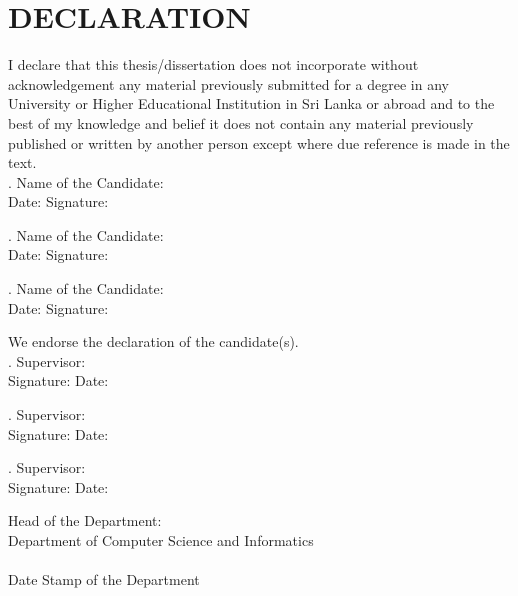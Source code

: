 \section*{DECLARATION}

I declare that this thesis/dissertation does not incorporate without
acknowledgement any material previously submitted for a degree in any
University or Higher Educational Institution in Sri Lanka or abroad and to the
best of my knowledge and belief it does not contain any material previously
published or written by another person except where due reference is made in
the text. \\

. Name of the Candidate: \\
\noindent Date: \makebox[3cm]{\hrulefill} \hfill Signature: \makebox[5cm]{\hrulefill}

\vspace{0.5\baselineskip}

. Name of the Candidate: \\
\noindent Date: \makebox[3cm]{\hrulefill} \hfill Signature: \makebox[5cm]{\hrulefill}

\vspace{0.5\baselineskip}

. Name of the Candidate: \\
\noindent Date: \makebox[3cm]{\hrulefill} \hfill Signature: \makebox[5cm]{\hrulefill}

\vspace{0.75\baselineskip}

\noindent We endorse the declaration of the candidate(s). \\

. Supervisor: \\
\noindent Signature: \makebox[5cm]{\hrulefill} \hfill Date: \makebox[3cm]{\hrulefill}

\vspace{0.5\baselineskip}

. Supervisor: \\
\noindent Signature: \makebox[5cm]{\hrulefill} \hfill Date: \makebox[3cm]{\hrulefill}

\vspace{0.5\baselineskip}

. Supervisor: \\
\noindent Signature: \makebox[5cm]{\hrulefill} \hfill Date: \makebox[3cm]{\hrulefill}

\vfill

\noindent Head of the Department: \\
\noindent Department of Computer Science and Informatics \\

\noindent \makebox[6cm]{\hrulefill} \\ [-0.3em]
\noindent Date Stamp of the Department

\clearpage
